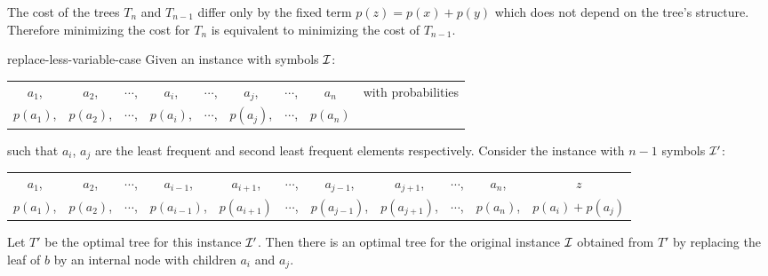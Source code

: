 \begin{observation*}
	The cost of the trees $T_n$ and $T_{n-1}$ differ only by the fixed term $p(z)=p(x)+p(y)$ which does not depend on the tree's structure. Therefore minimizing the cost for $T_n$ is equivalent to minimizing the cost of $T_{n-1}$.
\end{observation*}
\begin{Theorem}{}{replace-less-variable-case}
	Given an instance with symbols $\mathcal{I}$: \begin{center}
		\begin{tabular}{ccccccccc}
			$a_1$, & $a_2$, & $\cdots$, & $a_i$, & $\cdots$, & $a_j$, & $\cdots$, & $a_n$ & with probabilities\\
			$p(a_1)$, & $p(a_2)$, & $\cdots$, & $p(a_i)$, & $\cdots$, & $p(a_j)$, & $\cdots$, & $p(a_n)$ &
		\end{tabular} 
	\end{center}
	such that $a_i$, $a_j$ are the least frequent and second least frequent elements respectively. Consider the instance with $n-1$ symbols $\mathcal{I}'$:
	\begin{center}
		\begin{tabular}{ccccccccccc}
			$a_1$, & $a_2$, & $\cdots$, & $a_{i-1}$, & $a_{i+1}$,& $\cdots$, & $a_{j-1}$,& $a_{j+1}$, & $\cdots$, & $a_n$, & $z$ \\
			$p(a_1)$, & $p(a_2)$, & $\cdots$, & $p(a_{i-1})$,&$p(a_{i+1})$  & $\cdots$, & $p(a_{j-1})$,& $p(a_{j+1})$, & $\cdots$, & $p(a_n)$, & $p(a_i)+p(a_j)$ 
		\end{tabular} 
	\end{center}
	Let $T'$ be the optimal tree for this instance $\mathcal{I}'$. Then there is an optimal tree for the original instance $\mathcal{I}$ obtained from $T'$ by replacing the leaf of $b$ by an internal node with children $a_i$ and $a_j$.
\end{Theorem}
